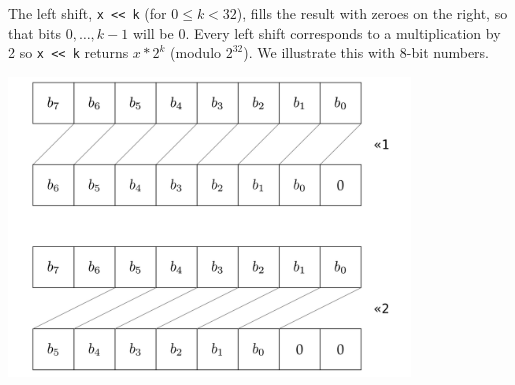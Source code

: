 \begin{gram}
The left shift, \lstinline'x << k' (for $0 \leq k < 32$), fills the result
with zeroes on the right, so that bits $0, \ldots, k-1$ will be 0.
Every left shift corresponds to a multiplication by 2 so \lstinline'x << k'
returns $x * 2^k$ (modulo $2^{32}$).  We illustrate this with 8-bit
numbers.

\begin{center}
  \includegraphics[width=0.8\textwidth]{img/left-shift.png}
\end{center}
\end{gram}

